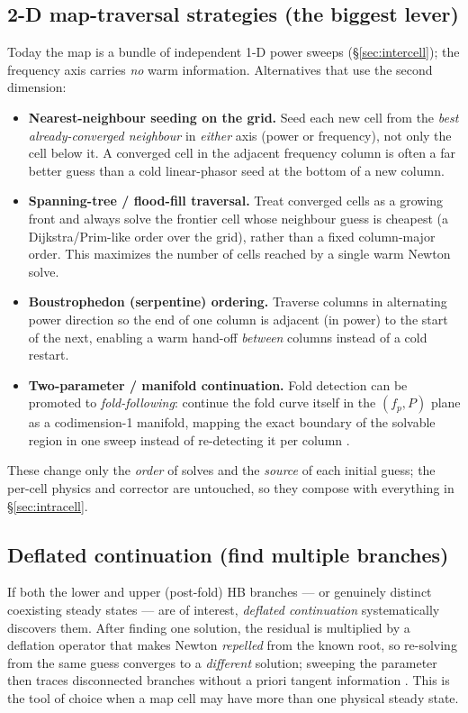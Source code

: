 \documentclass[11pt]{article}
\begin{document}
\subsection{2-D map-traversal strategies (the biggest lever)}
Today the map is a bundle of independent 1-D power sweeps
(\S\ref{sec:intercell}); the frequency axis carries \emph{no} warm information.
Alternatives that use the second dimension:
\begin{itemize}[leftmargin=*]
  \item \textbf{Nearest-neighbour seeding on the grid.} Seed each new cell from
    the \emph{best already-converged neighbour} in \emph{either} axis (power or
    frequency), not only the cell below it. A converged cell in the adjacent
    frequency column is often a far better guess than a cold linear-phasor seed
    at the bottom of a new column.
  \item \textbf{Spanning-tree / flood-fill traversal.} Treat converged cells as a
    growing front and always solve the frontier cell whose neighbour guess is
    cheapest (a Dijkstra/Prim-like order over the grid), rather than a fixed
    column-major order. This maximizes the number of cells reached by a single
    warm Newton solve.
  \item \textbf{Boustrophedon (serpentine) ordering.} Traverse columns in
    alternating power direction so the end of one column is adjacent (in power)
    to the start of the next, enabling a warm hand-off \emph{between} columns
    instead of a cold restart.
  \item \textbf{Two-parameter / manifold continuation.} Fold detection can be
    promoted to \emph{fold-following}: continue the fold curve itself in the
    $(f_p, P)$ plane as a codimension-1 manifold, mapping the exact boundary of
    the solvable region in one sweep instead of re-detecting it per column
    \cite{DhoogeMatcont2003,AllgowerGeorg2003}.
\end{itemize}
These change only the \emph{order} of solves and the \emph{source} of each
initial guess; the per-cell physics and corrector are untouched, so they compose
with everything in \S\ref{sec:intracell}.

\subsection{Deflated continuation (find multiple branches)}
If both the lower and upper (post-fold) HB branches --- or genuinely distinct
coexisting steady states --- are of interest, \emph{deflated continuation}
systematically discovers them. After finding one solution, the residual is
multiplied by a deflation operator that makes Newton \emph{repelled} from the
known root, so re-solving from the same guess converges to a \emph{different}
solution; sweeping the parameter then traces disconnected branches without a
priori tangent information \cite{FarrellBirkissonFunke2015}. This is the tool of
choice when a map cell may have more than one physical steady state.
\end{document}
